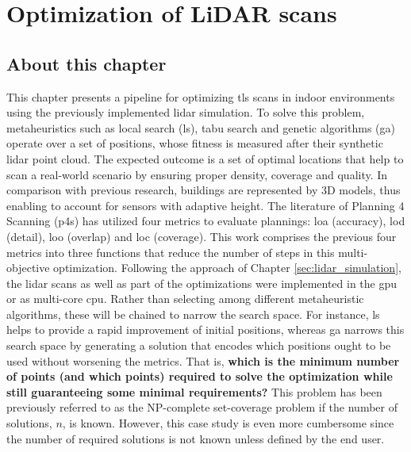 \setchapterpreamble[u]{\margintoc}
\chapter{Optimization of LiDAR scans}
\label{sec:lidar_optimization}

\section*{About this chapter}

This chapter presents a pipeline for optimizing \acrshort{tls} scans in indoor environments using the previously implemented \acrshort{lidar} simulation. To solve this problem, metaheuristics such as local search (\acrshort{ls}), tabu search and genetic algorithms (\acrshort{ga}) operate over a set of positions, whose fitness is measured after their synthetic \acrshort{lidar} point cloud. The expected outcome is a set of optimal locations that help to scan a real-world scenario by ensuring proper density, coverage and quality. In comparison with previous research, buildings are represented by 3D models, thus enabling to account for sensors with adaptive height. The literature of Planning 4 Scanning (\acrshort{p4s}) has utilized four metrics to evaluate plannings: \acrshort{loa} (accuracy), \acrshort{lod} (detail), \acrshort{loo} (overlap) and \acrshort{loc} (coverage). This work comprises the previous four metrics into three functions that reduce the number of steps in this multi-objective optimization. Following the approach of Chapter \ref{sec:lidar_simulation}, the \acrshort{lidar} scans as well as part of the optimizations were implemented in the \acrshort{gpu} or as multi-core \acrshort{cpu}. Rather than selecting among different metaheuristic algorithms, these will be chained to narrow the search space. For instance, \acrshort{ls} helps to provide a rapid improvement of initial positions, whereas \acrshort{ga} narrows this search space by generating a solution that encodes which positions ought to be used without worsening the metrics. That is, \textbf{which is the minimum number of points (and which points) required to solve the optimization while still guaranteeing some minimal requirements?} This problem has been previously referred to as the NP-complete set-coverage problem \cite{li_probability_2021, mohamadi_efficient_2021, roostapour_pareto_2022} if the number of solutions, $n$, is known. However, this case study is even more cumbersome since the number of required solutions is not known unless defined by the end user. 

